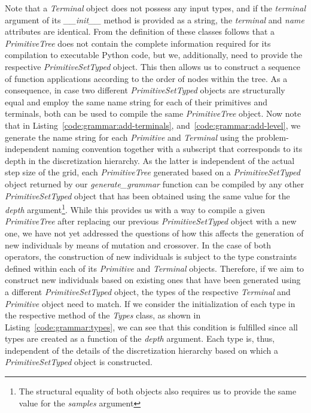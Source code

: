 Note that a \emph{Terminal} object does not possess any input types, and if the \emph{terminal} argument of its \emph{\_\_init\_\_} method is provided as a string, the \emph{terminal} and \emph{name} attributes are identical.
From the definition of these classes follows that a \emph{PrimitiveTree} does not contain the complete information required for its compilation to executable Python code, but we, additionally, need to provide the respective \emph{PrimitiveSetTyped} object.
This then allows us to construct a sequence of function applications according to the order of nodes within the tree.  
As a consequence, in case two different \emph{PrimitiveSetTyped} objects are structurally equal and employ the same name string for each of their primitives and terminals, both can be used to compile the same \emph{PrimitiveTree} object.
Now note that in Listing~\ref{code:grammar:add-terminals}, and~\ref{code:grammar:add-level}, we generate the name string for each \emph{Primitive} and \emph{Terminal} using the problem-independent naming convention together with a subscript that corresponds to its depth in the discretization hierarchy.
As the latter is independent of the actual step size of the grid, each \emph{PrimitiveTree} generated based on a \emph{PrimitiveSetTyped} object returned by our \emph{generate\_grammar} function can be compiled by any other \emph{PrimitiveSetTyped} object that has been obtained using the same value for the \emph{depth} argument\footnote{The structural equality of both objects also requires us to provide the same value for the \emph{samples} argument}.
While this provides us with a way to compile a given \emph{PrimitiveTree} after replacing our previous \emph{PrimitiveSetTyped} object with a new one, we have not yet addressed the questions of how this affects the generation of new individuals by means of mutation and crossover.
In the case of both operators, the construction of new individuals is subject to the type constraints defined within each of its \emph{Primitive} and \emph{Terminal} objects.
Therefore, if we aim to construct new individuals based on existing ones that have been generated using a different \emph{PrimitiveSetTyped} object, the types of the respective \emph{Terminal} and \emph{Primitive} object need to match.
If we consider the initialization of each type in the respective method of the \emph{Types} class, as shown in Listing~\ref{code:grammar:types}, we can see that this condition is fulfilled since all types are created as a function of the \emph{depth} argument.
Each type is, thus, independent of the details of the discretization hierarchy based on which a \emph{PrimitiveSetTyped} object is constructed.
